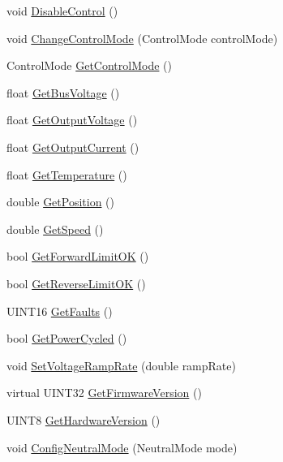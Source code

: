 \begin{DoxyCompactItemize}
\item 
void \hyperlink{class_l_r_t_c_a_n_jaguar_a62df7086ec827502bba1f4ee2c34742c}{\-Disable\-Control} ()
\item 
void \hyperlink{class_l_r_t_c_a_n_jaguar_a420a3f09a4286a4e153a69b10f8517ad}{\-Change\-Control\-Mode} (\-Control\-Mode control\-Mode)
\item 
\-Control\-Mode \hyperlink{class_l_r_t_c_a_n_jaguar_a71949e1621b88599b6bd15289a0034c6}{\-Get\-Control\-Mode} ()
\item 
float \hyperlink{class_l_r_t_c_a_n_jaguar_a13d4019a8b813a14835434fafacc3f0d}{\-Get\-Bus\-Voltage} ()
\item 
float \hyperlink{class_l_r_t_c_a_n_jaguar_a54e2f48af73e76f07586520a5b79492e}{\-Get\-Output\-Voltage} ()
\item 
float \hyperlink{class_l_r_t_c_a_n_jaguar_a3a76dbf05064c7e2e3a0dd11fcc34dbe}{\-Get\-Output\-Current} ()
\item 
float \hyperlink{class_l_r_t_c_a_n_jaguar_afadcb4c87a87964c87862738deb7a41b}{\-Get\-Temperature} ()
\item 
double \hyperlink{class_l_r_t_c_a_n_jaguar_aed8795668927fe8039f58a8c51ef3b61}{\-Get\-Position} ()
\item 
double \hyperlink{class_l_r_t_c_a_n_jaguar_a8502c320c570bfc34b8e9b7c56f61a03}{\-Get\-Speed} ()
\item 
bool \hyperlink{class_l_r_t_c_a_n_jaguar_a31a767f645cd0d6abc2b0e2f0fea6e71}{\-Get\-Forward\-Limit\-O\-K} ()
\item 
bool \hyperlink{class_l_r_t_c_a_n_jaguar_aa1f4b0d8395fce90d26b6d2e74067bf9}{\-Get\-Reverse\-Limit\-O\-K} ()
\item 
\-U\-I\-N\-T16 \hyperlink{class_l_r_t_c_a_n_jaguar_a97afb0fc0d6a06a063f98cad06db678a}{\-Get\-Faults} ()
\item 
bool \hyperlink{class_l_r_t_c_a_n_jaguar_a25945193e053a1fedcc08d09ba9ee281}{\-Get\-Power\-Cycled} ()
\item 
void \hyperlink{class_l_r_t_c_a_n_jaguar_abce26cf7c581a969b5270aca4e8faca2}{\-Set\-Voltage\-Ramp\-Rate} (double ramp\-Rate)
\item 
virtual \-U\-I\-N\-T32 \hyperlink{class_l_r_t_c_a_n_jaguar_aa1c7172289e7fce91d6b19462ab0f665}{\-Get\-Firmware\-Version} ()
\item 
\-U\-I\-N\-T8 \hyperlink{class_l_r_t_c_a_n_jaguar_a55730d4ef7cd2000c91060119a9aff22}{\-Get\-Hardware\-Version} ()
\item 
void \hyperlink{class_l_r_t_c_a_n_jaguar_a9c472bcd0668a8d72c34b49fd766fa55}{\-Config\-Neutral\-Mode} (\-Neutral\-Mode mode)

\end{DoxyCompactItemize}
